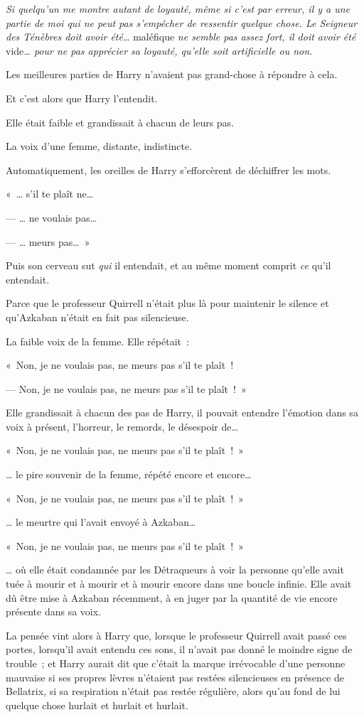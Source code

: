 \emph{Si quelqu'un me montre autant de loyauté, même si c'est par erreur, il y a une partie de moi qui ne peut pas s'empêcher de ressentir quelque chose.
Le Seigneur des Ténèbres doit avoir été…} maléfique \emph{ne semble pas assez fort, il doit avoir été} vide\emph{… pour ne pas apprécier sa loyauté, qu'elle soit artificielle ou non.}

Les meilleures parties de Harry n'avaient pas grand-chose à répondre à cela.

Et c'est alors que Harry l'entendit.

Elle était faible et grandissait à chacun de leurs pas.

La voix d'une femme, distante, indistincte.

Automatiquement, les oreilles de Harry s'efforcèrent de déchiffrer les mots.

«~… s'il te plaît ne…

--- … ne voulais pas…

--- … meurs pas…~»

Puis son cerveau sut \emph{qui} il entendait, et au même moment comprit \emph{ce} qu'il entendait.

Parce que le professeur Quirrell n'était plus là pour maintenir le silence et qu'Azkaban n'était en fait pas silencieuse.

La faible voix de la femme.
Elle répétait~:

«~Non, je ne voulais pas, ne meurs pas s'il te plaît~!

--- Non, je ne voulais pas, ne meurs pas s'il te plaît~!~»

Elle grandissait à chacun des pas de Harry, il pouvait entendre l'émotion dans sa voix à présent, l'horreur, le remords, le désespoir de…

«~Non, je ne voulais pas, ne meurs pas s'il te plaît~!~»

… le pire souvenir de la femme, répété encore et encore…

«~Non, je ne voulais pas, ne meurs pas s'il te plaît~!~»

… le meurtre qui l'avait envoyé à Azkaban…

«~Non, je ne voulais pas, ne meurs pas s'il te plaît~!~»

… où elle était condamnée par les Détraqueurs à voir la personne qu'elle avait tuée à mourir et à mourir et à mourir encore dans une boucle infinie.
Elle avait dû être mise à Azkaban récemment, à en juger par la quantité de vie encore présente dans sa voix.

La pensée vint alors à Harry que, lorsque le professeur Quirrell avait passé ces portes, lorsqu'il avait entendu ces sons, il n'avait pas donné le moindre signe de trouble~; et Harry aurait dit que c'était la marque irrévocable d'une personne mauvaise si ses propres lèvres n'étaient pas restées silencieuses en présence de Bellatrix, si sa respiration n'était pas restée régulière, alors qu'au fond de lui quelque chose hurlait et hurlait et hurlait.

